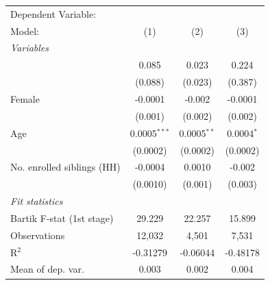 \begin{tabular}{lccc}
   \tabularnewline \midrule \midrule
   Dependent Variable: & \\
   Model:                                                         & (1)            & (2)           & (3)\\  
   \midrule
   \emph{Variables}\\
        & 0.085          & 0.023         & 0.224\\   
                                                                  & (0.088)        & (0.023)       & (0.387)\\   
   Female                                                         & -0.0001        & -0.002        & -0.0001\\   
                                                                  & (0.001)        & (0.002)       & (0.002)\\   
   Age                                                            & 0.0005$^{***}$ & 0.0005$^{**}$ & 0.0004$^{*}$\\   
                                                                  & (0.0002)       & (0.0002)      & (0.0002)\\   
   No. enrolled siblings (HH)                                     & -0.0004        & 0.0010        & -0.002\\   
                                                                  & (0.0010)       & (0.001)       & (0.003)\\   
   \midrule
   \emph{Fit statistics}\\
   Bartik F-stat (1st stage)                                  & 29.229         & 22.257        & 15.899\\  
   Observations                                                   & 12,032         & 4,501         & 7,531\\  
   R$^2$                                                          & -0.31279       & -0.06044      & -0.48178\\  
   Mean of dep. var.                                              & 0.003          & 0.002         & 0.004\\  
\bottomrule
\end{tabular}
